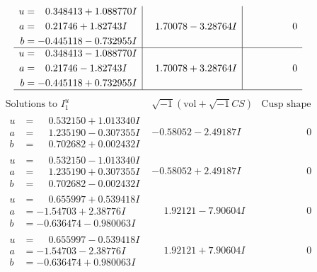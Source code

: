 \documentclass[1p]{elsarticle_modified}
\theoremstyle{definition}
\newcommand{\I}{\sqrt{-1}}
\begin{document}
$$\begin{array}{c|c|c}
\begin{aligned}
u &= \phantom{-}0.348413 + 1.088770 I \\
a &= \phantom{-}0.21746 + 1.82743 I \\
b &= -0.445118 - 0.732955 I\end{aligned}
 & \phantom{-}1.70078 - 3.28764 I & \phantom{-0.000000 } 0 \\ \hline\begin{aligned}
u &= \phantom{-}0.348413 - 1.088770 I \\
a &= \phantom{-}0.21746 - 1.82743 I \\
b &= -0.445118 + 0.732955 I\end{aligned}
 & \phantom{-}1.70078 + 3.28764 I & \phantom{-0.000000 } 0\\
 \hline 
 \end{array}$$\newpage$$\begin{array}{c|c|c}  
\text{Solutions to }I^u_{1}& \I (\text{vol} + \sqrt{-1}CS) & \text{Cusp shape}\\
 \hline 
\begin{aligned}
u &= \phantom{-}0.532150 + 1.013340 I \\
a &= \phantom{-}1.235190 - 0.307355 I \\
b &= \phantom{-}0.702682 + 0.002432 I\end{aligned}
 & -0.58052 - 2.49187 I & \phantom{-0.000000 } 0 \\ \hline\begin{aligned}
u &= \phantom{-}0.532150 - 1.013340 I \\
a &= \phantom{-}1.235190 + 0.307355 I \\
b &= \phantom{-}0.702682 - 0.002432 I\end{aligned}
 & -0.58052 + 2.49187 I & \phantom{-0.000000 } 0 \\ \hline\begin{aligned}
u &= \phantom{-}0.655997 + 0.539418 I \\
a &= -1.54703 + 2.38776 I \\
b &= -0.636474 - 0.980063 I\end{aligned}
 & \phantom{-}1.92121 - 7.90604 I & \phantom{-0.000000 } 0 \\ \hline\begin{aligned}
u &= \phantom{-}0.655997 - 0.539418 I \\
a &= -1.54703 - 2.38776 I \\
b &= -0.636474 + 0.980063 I\end{aligned}
 & \phantom{-}1.92121 + 7.90604 I & \phantom{-0.000000 } 0 \\ \hline\begin{aligned}

\end{aligned}
\end{array}$$
\end{document}
